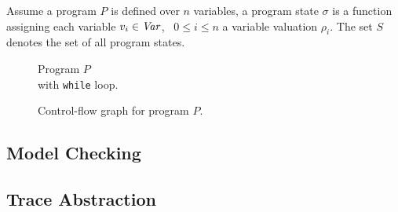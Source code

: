 
\begin{mydef}
	Assume a program $P$ is defined over $n$ variables, a program state $\sigma$ is a function assigning each variable $v_i \in \mathit{Var}$, \ $0 \leq i \leq n$ a variable valuation $\rho_i$. The set $S$ denotes the set of all program states.
\end{mydef}

\begin{center}
	\begin{minipage}[b]{0.4\linewidth}
			\begin{figure}[H]
			\centering
			
			\caption{Program $P$ \\ with \texttt{while} loop.}
			\label{code}
		\end{figure}
	\end{minipage}
	\hfill
	\begin{minipage}[b]{0.59\linewidth}
		\begin{figure}[H]
			\centering
			
			\caption{Control-flow graph for program $P$.}
			\label{code}
		\end{figure}
	\end{minipage}
\end{center}


\subsection{Model Checking}


\subsection{Trace Abstraction}